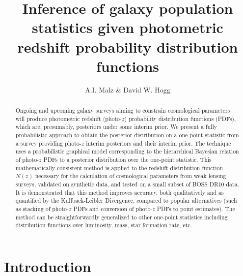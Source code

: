 \documentclass[preprint]{aastex}
\begin{document}
\title{Inference of galaxy population statistics given photometric redshift 
probability distribution functions}

\author{A.I. Malz \& David W. Hogg}


\begin{abstract}
Ongoing and upcoming galaxy surveys aiming to constrain cosmological parameters 
will produce photometric redshift (photo-$z$) probability distribution 
functions (PDFs), which are, presumably, posteriors under some interim prior.  
We present a fully probabilistic approach to obtain the posterior distribution 
on a one-point statistic from a survey providing photo-$z$ interim posteriors 
and their interim prior.  The technique uses a probabilistic graphical model 
corresponding to the hierarchical Bayesian relation of photo-$z$ PDFs to a 
posterior distribution over the one-point statistic.  This mathematically 
consistent method is applied to the redshift distribution function $N(z)$ 
necessary for the calculation of cosmological parameters from weak lensing 
surveys, validated on synthetic data, and tested on a small subset of BOSS DR10 
data.  It is demonstrated that this method improves accuracy, both 
qualitatively and as quantified by the Kullback-Leibler Divergence, compared to 
popular alternatives (such as stacking of photo-$z$ PDFs and conversion of 
photo-$z$ PDFs to point estimates).  The method can be straightforwardly 
generalized to other one-point statistics including distribution functions over 
luminosity, mass, star formation rate, etc.
\end{abstract}


\clearpage
\section{Introduction}
\label{sec:intro}
\end{document}

